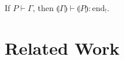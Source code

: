 \documentclass[orivec,envcountsame]{llncs}
\newcommand{\cpdual}[1]{#1^\perp}
\newcommand{\gvdual}[1]{\overline{#1}}
\newcommand{\gvout}[2]{{!#1.#2}}
\newcommand{\outterm}{\mathrm{end}_!}
\newcommand{\gvservice}[1]{\sharp #1}
\newcommand{\cptyp}[2]{#1 \vdash #2}
\newcommand{\gvtyp}[3]{#1 \vdash #2 : #3}
\newcommand{\mkwd}[1]{\mathsf{#1}}
\newcommand{\link}[2]{#1 \leftrightarrow #2}
\newcommand{\cut}[4]{\mkwd{new}\:#1 \: (#3 \mid #4)}
\newcommand{\replicate}[2]{{!#1(#2)}}
\newcommand{\derelict}[2]{{?#1[#2]}}
\newcommand{\rec}[1]{\mkwd{rec}\:#1}
\newcommand{\corec}[5]{\mkwd{corec}\:#1 \langle #2 \rangle (#4,#5)}
\newcommand{\clabel}[1]{\mathrm{#1}}
\renewcommand{\case}[2]{\mkwd{case}\:#1\:\{#2\}}
\newcommand{\sel}[2]{#1[\clabel{#2}]}
\newcommand{\gvsend}[2]{\mkwd{send}\:#1\:#2}
\newcommand{\gvreceive}[1]{\mkwd{receive}\:#1}
\newcommand{\gvlet}[3]{\mkwd{let}\;#1 = #2\;\mkwd{in}\;#3}
\newcommand{\gvselect}[2]{\mkwd{select}\:#1\:#2}
\newcommand{\gvcase}[2]{\mkwd{case}\:#1\:\{#2\}}
\newcommand{\gvlink}[2]{\mkwd{link}\:#1\:#2}
\newcommand{\gvfork}[2]{\mkwd{fork}\:#1.#2}
\newcommand{\lrkwd}{\mkwd{cofix}}
\newcommand{\gvfix}[3]{\lrkwd\:#1\:#2 = #3}
\newcommand{\gvserve}[2]{\mkwd{serve}\:#1.#2}
\newcommand{\gvrequest}[1]{\mkwd{request}\:#1}
\newcommand{\togv}[1]{\llparenthesis #1 \rrparenthesis}
\begin{document}



\begin{theorem}
  If $\cptyp{P}{\Gamma}$, then $\gvtyp{\togv{\Gamma}}{\togv{P}}{\outterm}$.
\end{theorem}

\section{Related Work}\label{sec:related}
\end{document}
